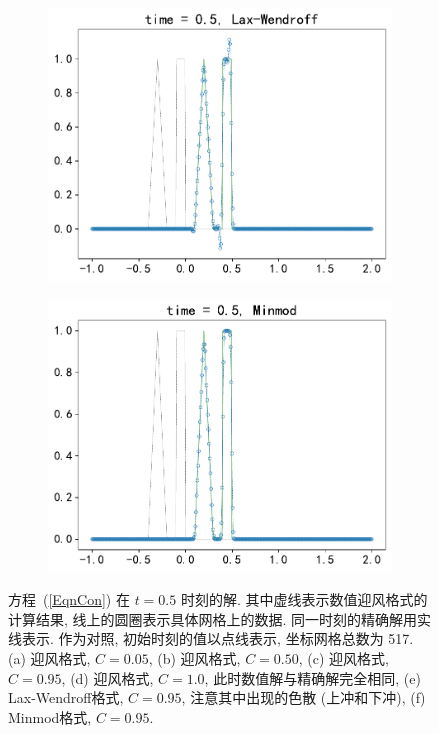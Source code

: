 \documentclass[10.5pt
]{article}
\begin{document}
\begin{figure}
\begin{subfigure}{.48\linewidth}
  \includegraphics[width=\textwidth]{figures/problem1_lax_wendroff0.95.pdf}
  \caption{}
  \label{fig:problem1-5}
\end{subfigure}
\hfill
\begin{subfigure}{.48\linewidth}
  \includegraphics[width=\textwidth]{figures/problem1_limiter0.95.pdf}
  \caption{}
  \label{fig:problem1-6}
\end{subfigure}
\caption{方程~(\ref{EqnCon}) 在 $t=0.5$ 时刻的解. 其中虚线表示数值迎风格式的计算结果, 线上的圆圈表示具体网格上的数据. 同一时刻的精确解用实线表示. 作为对照,
  初始时刻的值以点线表示, 坐标网格总数为 517. (a) 迎风格式, $C = 0.05$, (b)  迎风格式, $C = 0.50$, (c)  迎风格式, $C = 0.95$, (d) 迎风格式, $C = 1.0$,
  此时数值解与精确解完全相同, (e) Lax-Wendroff格式, $C=0.95$, 注意其中出现的色散 (上冲和下冲), (f) Minmod格式, $C=0.95$.} \label{LinearW}
  \label{fig:problem1}%
\end{figure}
\end{document}
